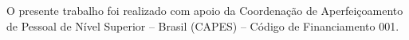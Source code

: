 O presente trabalho foi realizado com apoio da Coordenação de Aperfeiçoamento de Pessoal de Nível Superior -- Brasil (CAPES) -- Código de Financiamento 001.